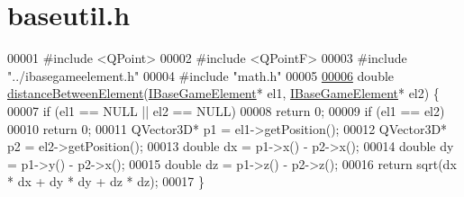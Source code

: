 \hypertarget{a00068_source}{}\section{baseutil.\+h}
\label{a00068_source}

\begin{DoxyCode}
00001 \textcolor{preprocessor}{#}\textcolor{preprocessor}{include} \textcolor{preprocessor}{<}\textcolor{preprocessor}{QPoint}\textcolor{preprocessor}{>}
00002 \textcolor{preprocessor}{#}\textcolor{preprocessor}{include} \textcolor{preprocessor}{<}\textcolor{preprocessor}{QPointF}\textcolor{preprocessor}{>}
00003 \textcolor{preprocessor}{#}\textcolor{preprocessor}{include} \textcolor{preprocessor}{"../ibasegameelement.h"}
00004 \textcolor{preprocessor}{#}\textcolor{preprocessor}{include} \textcolor{preprocessor}{"math.h"}
00005 
\hyperlink{a00068_a1ab36c07a61bd9f450ed0ac1ba68ed94}{00006} \textcolor{keywordtype}{double} \hyperlink{a00068_a1ab36c07a61bd9f450ed0ac1ba68ed94}{distanceBetweenElement}(\hyperlink{a00137_ae2be75da1a2a9edfabe993770e24654a}{IBaseGameElement}* el1, 
      \hyperlink{a00137_ae2be75da1a2a9edfabe993770e24654a}{IBaseGameElement}* el2) \{
00007   \textcolor{keywordflow}{if} (el1 == NULL || el2 == NULL)
00008     \textcolor{keywordflow}{return} 0;
00009   \textcolor{keywordflow}{if} (el1 == el2)
00010     \textcolor{keywordflow}{return} 0;
00011   QVector3D* p1 = el1->getPosition();
00012   QVector3D* p2 = el2->getPosition();
00013   \textcolor{keywordtype}{double} dx = p1->x() - p2->x();
00014   \textcolor{keywordtype}{double} dy = p1->y() - p2->x();
00015   \textcolor{keywordtype}{double} dz = p1->z() - p2->z();
00016   \textcolor{keywordflow}{return} sqrt(dx * dx + dy * dy + dz * dz);
00017 \}
\end{DoxyCode}
